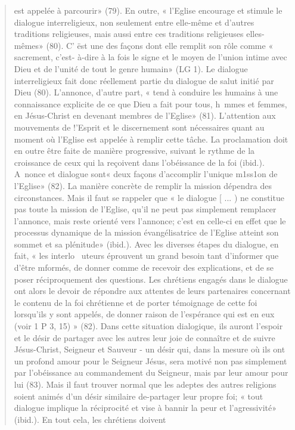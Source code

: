 \begin{quote}
est appelée à parcourir» (79). En outre, « l'Eglise encourage
et stimule le dialogue interreligieux, non seulement entre
elle-même et d'autres traditions religieuses, mais aussi entre
ces traditions religieuses elles-mêmes» (80). C' ëst une des 
façons dont elle remplit son rôle comme « sacrement, c'est-
à-dire à la fois le signe et le moyen de l'union intime avec
Dieu et de l'unité de tout le genre humain» (LG 1). Le dialogue
interreligieux fait donc réellement partie du dialogue de
salut initié par Dieu (80).
L'annonce, d'autre part, « tend à conduire les humains à une
connaissance explicite de ce que Dieu a fait pour tous,
h~mmes et femmes, en Jésus-Christ en devenant membres de
l'Eglise» (81). L'attention aux mouvements de !'Esprit et le
discernement sont nécessaires quant au moment où l'Eglise est
appelée à remplir cette tâche. La proclamation doit en outre
être faite de manière progressive, suivant le rythme de la croissance
de ceux qui la reçoivent dans l'obéissance de la foi
(ibid.).
A~nonce et dialogue sont« deux façons d'accomplir l'unique
m1ss1on de l'Eglise» (82). La manière concrète de remplir la
mission dépendra des circonstances. Mais il faut se rappeler
que « le dialogue [ ... ) ne constitue pas toute la mission de
l'Eglise, qu'il ne peut pas simplement remplacer l'annonce,
mais reste orienté vers l'annonce; c'est en celle-ci en effet
que le processus dynamique de la mission évangélisatrice de
l'Eglise atteint son sommet et sa plénitude» (ibid.).
Avec les diverses étapes du dialogue, en fait, « les interlo~
uteurs éprouvent un grand besoin tant d'informer que d'être
mformés, de donner comme de recevoir des explications, et de
se poser réciproquement des questions. Les chrétiens engagés
dans le dialogue ont alors le devoir de répondre aux attentes
de leurs partenaires concernant le contenu de la foi chrétienne
et de porter témoignage de cette foi lorsqu'ils y sont appelés,
de donner raison de l'espérance qui est en eux (voir 1 P 3,
15) » (82). Dans cette situation dialogique, ils auront l'espoir et
le désir de partager avec les autres leur joie de connaître et de
suivre Jésus-Christ, Seigneur et Sauveur - un désir qui, dans
la mesure où ils ont un profond amour pour le Seigneur Jésus,
sera motivé non pas simplement par l'obéissance au commandement
du Seigneur, mais par leur amour pour lui (83). Mais
il faut trouver normal que les adeptes des autres religions
soient animés d'un désir similaire de-partager leur propre foi;
« tout dialogue implique la réciprocité et vise à bannir la peur
et l'agressivité» (ibid.). En tout cela, les chrétiens doivent

\end{quote}
